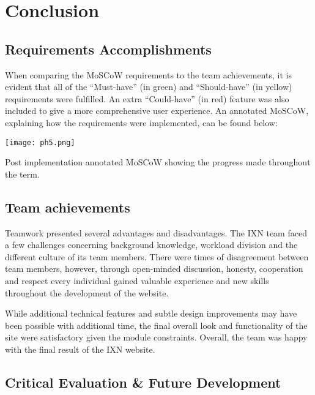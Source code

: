 \documentclass[fontsize=11pt]{extarticle}
\numberwithin{figure}{section} %
\numberwithin{table}{section}%
\begin{document}
\newpage

\hypertarget{conclusion}{%
\section{Conclusion}\label{conclusion}}

\hypertarget{requirements-accomplishments}{%
\subsection{Requirements
Accomplishments}\label{requirements-accomplishments}}

When comparing the MoSCoW requirements to the team achievements, it is
evident that all of the ``Must-have'' (in green) and ``Should-have'' (in
yellow) requirements were fulfilled. An extra ``Could-have'' (in red)
feature was also included to give a more comprehensive user experience.
An annotated MoSCoW, explaining how the requirements were implemented,
can be found below:

\begin{table}[H]
      \centering
      \texttt{[image: ph5.png]}
      \caption{Post implementation annotated MoSCoW showing the progress made throughout the term.}
 \end{table}

\hypertarget{team-achievements}{%
\subsection{Team achievements}\label{team-achievements}}

Teamwork presented several advantages and disadvantages. The IXN team
faced a few challenges concerning background knowledge, workload
division and the different culture of its team members. There were times
of disagreement between team members, however, through open-minded
discussion, honesty, cooperation and respect every individual gained
valuable experience and new skills throughout the development of the
website.

While additional technical features and subtle design improvements may
have been possible with additional time, the final overall look and
functionality of the site were satisfactory given the module
constraints. Overall, the team was happy with the final result of the
IXN website.

\hypertarget{critical-evaluation-future-development}{%
\subsection{Critical Evaluation \& Future
Development}\label{critical-evaluation-future-development}}
\end{document}
